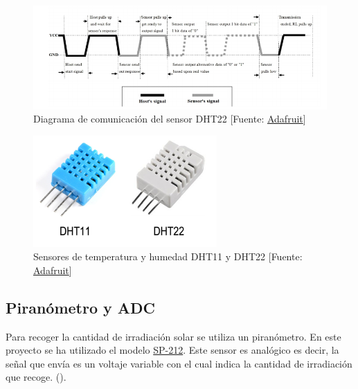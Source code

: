 \begin{figure}[htb]
	
	\begin{center}
		\includegraphics[width=15cm]{figures/DTH22comunicationdiagram.png}
		\caption{Diagrama de comunicación del sensor DHT22 [Fuente: \href{https://cdn-shop.adafruit.com/datasheets/Digital+humidity+and+temperature+sensor+AM2302.pdf}{Adafruit}]}
	\end{center}
	
	\label{DHT22comunication}
\end{figure} 

 \begin{figure}[htb]
	
	\begin{center}
		\includegraphics[width=7cm]{figures/sensorTemperaturaHumedad.png}
		\caption{Sensores de temperatura y humedad DHT11 y DHT22 [Fuente: \href{https://cdn-shop.adafruit.com/datasheets/Digital+humidity+and+temperature+sensor+AM2302.pdf}{Adafruit}]}
	\end{center}
	
	\label{sensor}
\end{figure} 

\subsection{Piranómetro y ADC}
\label{makereference2.2.3}
Para recoger la cantidad de irradiación solar se utiliza un piranómetro. En este proyecto se ha utilizado el modelo \href{https://www.apogeeinstruments.co.uk/content/SP-212-215-manual.pdf}{SP-212}. Este sensor es analógico es decir, la señal que envía es un voltaje variable con el cual indica la cantidad de irradiación que recoge. (\cite{ARP:Apogee:2017}).

